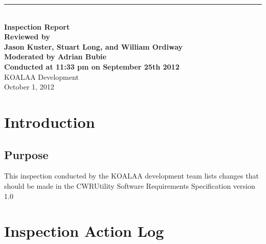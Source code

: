 \documentclass[pdftex,12pt,letter]{article}
\newcommand{\HRule}{\rule{\linewidth}{0.5mm}}
\begin{document}
\begin{titlepage}
\begin{flushright}
\HRule \\[0.4cm]
{ \bfseries
{\huge Inspection Report\\[1cm]}
{\large Reviewed by\\Jason Kuster, Stuart Long, and William Ordiway\\
\normalsize Moderated by Adrian Bubie}\\[1cm]
\normalsize Conducted at 11:33 pm on September 25th 2012}\\[1cm]
KOALAA Development\\[1cm]
October 1, 2012
\end{flushright}
\end{titlepage}
\begin{flushleft}
\section{Introduction}
\subsection{Purpose}
This inspection conducted by the KOALAA development team lists changes that should be made in the CWRUtility Software Requirements Specification version 1.0
\section{Inspection Action Log}


\end{flushleft}
\end{document}
